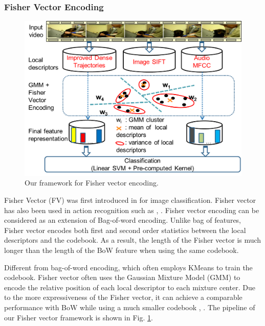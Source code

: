 \documentclass[twocolumn]{bmcart}%
\begin{document}
\subsubsection{Fisher Vector Encoding}
\begin{figure}
	\centering
	\includegraphics[width=1\linewidth,height=1\linewidth]{Images/framework_fv.png}
	\caption{Our framework for Fisher vector encoding.}
	\label{fig:fv_encoding}
\end{figure}
Fisher Vector (FV) was first introduced in \cite{jaakkola1999exploiting} for image classification. Fisher vector has also been used in action recognition such as \cite{sun2013large}, \cite{wang2013action}. Fisher vector encoding can be considered as an extension of Bag-of-word encoding. Unlike bag of features, Fisher vector encodes both first and second order statistics between the local descriptors and the codebook. As a result, the length of the Fisher vector is much longer than the length of the BoW feature when using the same codebook. 

Different from bag-of-word encoding, which often employs KMeans to train the codebook. Fisher vector often uses the Gaussian Mixture Model (GMM) to encode the relative position of each local descriptor to each mixture center. Due to the more expressiveness of the Fisher vector, it can achieve a comparable performance with BoW while using a much smaller codebook \cite{sanchez2013image}, \cite{sun2013large}. The pipeline of our Fisher vector framework is shown in Fig. \ref{fig:fv_encoding}.
\end{document}
